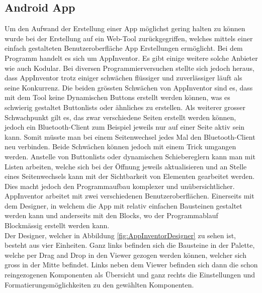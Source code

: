 \subsection{Android App}
\label{subsec:Software_App}

Um den Aufwand der Erstellung einer App möglichst gering halten zu können wurde bei der Erstellung auf ein Web-Tool zurückgegriffen, welches mittels einer einfach gestalteten Benutzeroberfläche App Erstellungen ermöglicht. Bei dem Programm handelt es sich um AppInventor. Es gibt einige weitere solche Anbieter wie auch Kodular. Bei diversen Programmierversuchen stellte sich jedoch heraus, dass AppInventor trotz einiger schwächen flüssiger und zuverlässiger läuft als seine Konkurrenz.  Die beiden grössten Schwächen von AppInventor sind es, dass mit dem Tool keine Dynamischen Buttons erstellt werden können, was es schwierig gestaltet Buttonlists oder ähnliches zu erstellen. Als weiterer grosser Schwachpunkt gilt es, das zwar verschiedene Seiten erstellt werden können, jedoch ein Bluetooth-Client zum Beispiel jeweils nur auf einer Seite aktiv sein kann. Somit müsste man bei einem Seitenwechsel jedes Mal den Bluetooth-Client neu verbinden. Beide Schwächen können jedoch mit einem Trick umgangen werden. Anstelle von Buttonlists oder dynamischen Schiebereglern kann man mit Listen arbeiten, welche sich bei der Öffnung jeweils aktualisieren und an Stelle eines Seitenwechsels kann mit der Sichtbarkeit von Elementen gearbeitet werden. Dies macht jedoch den Programmaufbau komplexer und unübersichtlicher. \cite{appinventor_mit_nodate} \cite{kodular_kodular_nodate} \\


AppInventor arbeitet mit zwei verschiedenen Benutzeroberflächen. Einerseits mit dem Designer, in welchem die App mit relativ einfachen Bausteinen gestaltet werden kann und anderseits mit den Blocks, wo der Programmablauf Blockmässig erstellt werden kann.\\

Der Designer, welcher in Abbildung \ref{fig:AppInventorDesigner} zu sehen ist, besteht aus vier Einheiten. Ganz links befinden sich die Bausteine in der Palette, welche per Drag and Drop in den Viewer gezogen werden können, welcher sich gross in der Mitte befindet. Links neben dem Viewer befinden sich dann die schon reingezogenen Komponenten als Übersicht und ganz rechts die Einstellungen und Formatierungsmöglichkeiten zu den gewählten Komponenten.

\newpage

